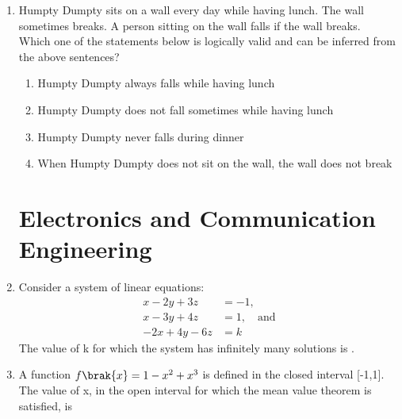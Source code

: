 \documentclass[a4paper, 11pt]{article}
\begin{document}
\begin{enumerate}
    \hfill{}

    \item Humpty Dumpty sits on a wall every day while having lunch. The wall sometimes breaks. A person sitting on the wall falls if the wall breaks.\\Which one of the statements below is logically valid and can be inferred from the above sentences?
    \begin{enumerate}
        \item Humpty Dumpty always falls while having lunch
        \item Humpty Dumpty does not fall sometimes while having lunch
        \item Humpty Dumpty never falls during dinner
        \item When Humpty Dumpty does not sit on the wall, the wall does not break
    \end{enumerate}
    
    \hfill{}
\section*{Electronics and Communication Engineering }
    \item Consider a system of linear equations:
    \begin{align*}
        x-2y+3z &= -1, \\
        x-3y+4z &= 1, \quad \text{and} \\
        -2x+4y-6z &= k
    \end{align*}
    The value of k for which the system has infinitely many solutions is \underline{\hspace{2cm}}.
    
    \hfill{}

    \item A function $f\brak{x}=1-x^{2}+x^{3}$ is defined in the closed interval [-1,1]. The value of x, in the open interval  for which the mean value theorem is satisfied, is
    \begin{enumerate}
    \end{enumerate}
    

\end{enumerate}
\end{document}

